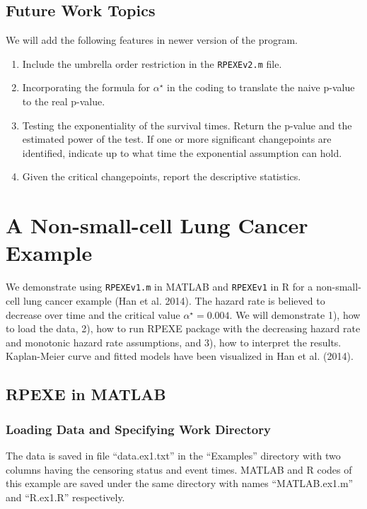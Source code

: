 \documentclass[12pt] {article}
\begin{document}
\subsection{Future Work Topics}
We will add the following features in newer version of the program.
\begin{enumerate}
\item Include the umbrella order restriction in the {\tt RPEXEv2.m} file.
\item Incorporating the formula for $\alpha^\star$ in the coding to translate the
naive p-value to the real p-value.
\item Testing the exponentiality of the survival times. Return the p-value and
the estimated power of the test. If one or more significant changepoints are
identified, indicate up to what time the exponential assumption can hold.
\item Given the critical changepoints, report the descriptive statistics.
\end{enumerate}

\section{A Non-small-cell Lung Cancer Example}
\label{sec4}
We demonstrate using {\tt RPEXEv1.m} in MATLAB and {\tt RPEXEv1} in R
for a non-small-cell lung cancer example (Han et al. 2014).
The hazard rate is believed to decrease over time and the critical value
$\alpha^\star=0.004$. We will demonstrate 1), how to load the data,
2), how to run RPEXE package with the decreasing hazard rate and monotonic
hazard rate assumptions, and 3), how to interpret the results. Kaplan-Meier
curve and fitted models have been visualized in Han et al. (2014).



\subsection{RPEXE in MATLAB}
\subsubsection{Loading Data and Specifying Work Directory}
The data is saved in file ``data.ex1.txt'' in the ``Examples'' directory with 
two columns having the censoring status and event times. MATLAB and R codes 
of this example are saved under the same directory with names ``MATLAB.ex1.m'' 
and ``R.ex1.R'' respectively.
\end{document}
